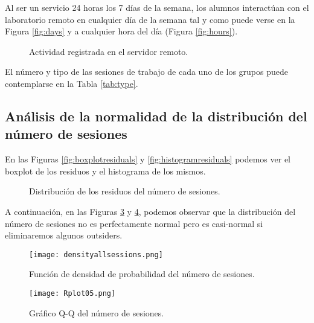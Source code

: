 Al ser un servicio 24 horas los 7 días de la semana, los alumnos interactúan con el laboratorio remoto en cualquier día de la semana tal y como puede verse en la Figura \ref{fig:days} y a cualquier hora del día (Figura \ref{fig:hours}).

\begin{figure}[H]
\centering
{}\qquad
{}
\caption{Actividad registrada en el servidor remoto.}
\label{fig:activity}
\end{figure}

El número y tipo de las sesiones de trabajo de cada uno de los grupos puede contemplarse en la Tabla \ref{tab:type}.

\subsection{Análisis de la normalidad de la distribución del número de sesiones}\label{sec:NormalityNumSessions}

En las Figuras \ref{fig:boxplotresiduals} y \ref{fig:histogramresiduals} podemos ver el boxplot de los residuos y el histograma de los mismos.

\begin{figure}[H]
\centering
{}\qquad
{}
\caption{Distribución de los residuos del número de sesiones.}
\label{fig:activity}
\end{figure}

A continuación, en las Figuras \ref{fig:densitysessions} y \ref{fig:q-qsessions}, podemos observar que la distribución del número de sesiones no es perfectamente normal pero es casi-normal si eliminaremos algunos outsiders.

\begin{figure}[H]
    \centering
    \texttt{[image: densityallsessions.png]}
    \caption{Función de densidad de probabilidad del número de sesiones.}
    \label{fig:densitysessions}
\end{figure}


\begin{figure}[H]
    \centering
    \texttt{[image: Rplot05.png]}
    \caption{Gráfico Q-Q del número de sesiones.}
    \label{fig:q-qsessions}
\end{figure}

